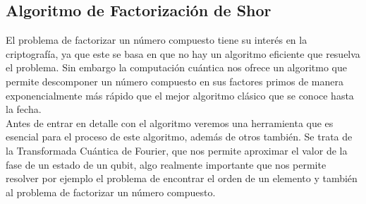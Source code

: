 \documentclass[a4paper]{article}
\numberwithin{equation}{section}
\begin{document}
\newpage

\subsection{Algoritmo de Factorización de Shor}
El problema de factorizar un número compuesto tiene su interés en la criptografía, ya que este se basa en que no hay un algoritmo eficiente que resuelva el problema. Sin embargo la computación cuántica nos ofrece un algoritmo que permite descomponer un número compuesto en sus factores primos de manera exponencialmente más rápido que el mejor algoritmo clásico que se conoce hasta la fecha.\\
\linebreak
Antes de entrar en detalle con el algoritmo veremos una herramienta que es esencial para el proceso de este algoritmo, además de otros también. Se trata de la Transformada Cuántica de Fourier, que nos permite aproximar el valor de la fase de un estado de un qubit, algo realmente importante que nos permite resolver por ejemplo el problema de encontrar el orden de un elemento y también al problema de factorizar un número compuesto.\\
\end{document}
